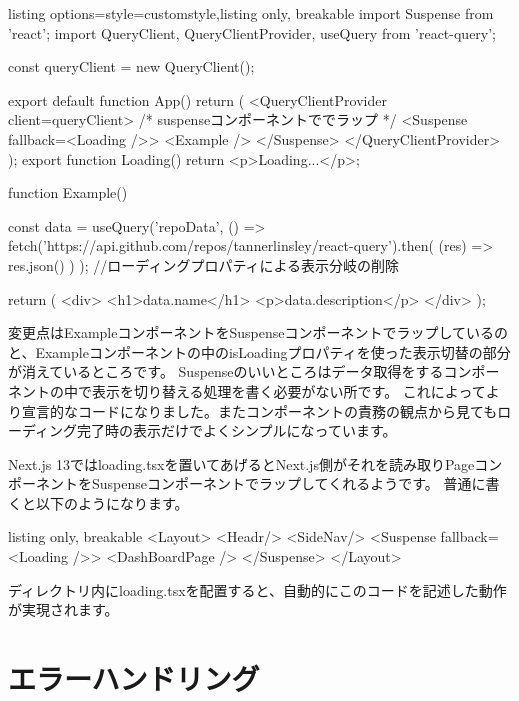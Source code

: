 \begin{tcblisting}{listing options={style=customstyle},listing only, breakable}
import { Suspense } from 'react';
import { QueryClient, QueryClientProvider, useQuery } from 'react-query';

const queryClient = new QueryClient();

export default function App() {
  return (
    <QueryClientProvider client={queryClient}>
      {/* suspenseコンポーネントででラップ */}
      <Suspense fallback={<Loading />}>
        <Example />
      </Suspense>
    </QueryClientProvider>
  );
}
export function Loading() {
  return <p>Loading...</p>;
}

function Example() {
  const { data } = useQuery('repoData', () =>
    fetch('https://api.github.com/repos/tannerlinsley/react-query').then(
      (res) => res.json()
    )
  );
  //ローディングプロパティによる表示分岐の削除

  return (
    <div>
      <h1>{data.name}</h1>
      <p>{data.description}</p>
    </div>
  );
}

\end{tcblisting}





変更点はExampleコンポーネントをSuspenseコンポーネントでラップしているのと、Exampleコンポーネントの中のisLoadingプロパティを使った表示切替の部分が消えているところです。
Suspenseのいいところはデータ取得をするコンポーネントの中で表示を切り替える処理を書く必要がない所です。
これによってより宣言的なコードになりました。またコンポーネントの責務の観点から見てもローディング完了時の表示だけでよくシンプルになっています。

Next.js 13ではloading.tsxを置いてあげるとNext.js側がそれを読み取りPageコンポーネントをSuspenseコンポーネントでラップしてくれるようです。
普通に書くと以下のようになります。



\begin{tcblisting}{listing only, breakable}
  <Layout>
    <Headr/>
    <SideNav/>
    <Suspense fallback={<Loading />}>
      <DashBoardPage />
    </Suspense>
  </Layout>
\end{tcblisting}

ディレクトリ内にloading.tsxを配置すると、自動的にこのコードを記述した動作が実現されます。



\section{エラーハンドリング}

